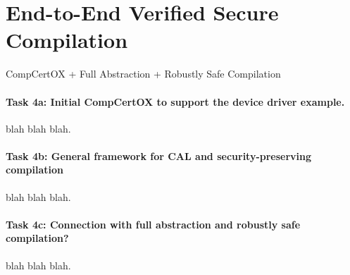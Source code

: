 \section{End-to-End Verified Secure Compilation}

CompCertOX + Full Abstraction + Robustly Safe Compilation


\paragraph*{Task 4a: Initial CompCertOX to support the device driver example.}
blah blah blah.

\paragraph*{Task 4b: General framework for CAL and security-preserving compilation}
blah blah blah.

\paragraph*{Task 4c: Connection with full abstraction and robustly safe compilation?} 
blah blah blah.
    
